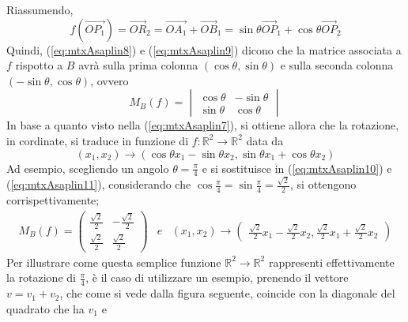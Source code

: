 \begin{es}
\begin{enumerate}
    Riassumendo,
    \begin{equation}
      \label{eq:mtxAsaplin9}
      f(\vec{OP_1})=\vec{OR}_2=\vec{OA_1}+\vec{OB}_1=\sin\theta
      \vec{OP}_1+\cos\theta\vec{OP}_2
    \end{equation}
    Quindi, (\ref{eq:mtxAsaplin8}) e (\ref{eq:mtxAsaplin9}) dicono
    che la matrice associata a $f$ rispotto a $B$ avrà sulla prima
    colonna $(\cos\theta, \sin\theta)$ e sulla seconda colonna
    $(-\sin \theta, \cos\theta)$, ovvero
    \begin{equation}
      \label{eq:mtxAsaplin10}
      M_B(f)=
      \begin{vmatrix}
        \cos\theta & -\sin\theta\\
        \sin\theta & \cos \theta
      \end{vmatrix}
    \end{equation}
    In base a quanto visto nella (\ref{eq:mtxAsaplin7}), si ottiene
    allora che la rotazione, in cordinate, si traduce in funzione di
    $f:\mathds{R}^2\to\mathds{R}^2$ data da
    \begin{equation}
      \label{eq:mtxAsaplin11}
      (x_1,x_2)\to (\cos\theta{}x_1-\sin\theta{}x_2,\sin\theta{}x_1
      +\cos\theta{}x_2)
    \end{equation}
    Ad esempio, scegliendo un angolo $\theta=\frac{\pi}{4}$ e si
    sostituisce in (\ref{eq:mtxAsaplin10}) e (\ref{eq:mtxAsaplin11}),
    considerando che $\cos\frac{\pi}{4}=\sin\frac{\pi}{4}=\frac{\sqrt{2}}{2}$,
    si ottengono corrispettivamente;
    \begin{eqnarray}
      \label{eq:mtxAsaplin12}
      M_B(f)=
      \begin{pmatrix}
        \frac{\sqrt{2}}{2} & -\frac{\sqrt{2}}{2}\\
        \frac{\sqrt{2}}{2} & \frac{\sqrt{2}}{2}
      \end{pmatrix} & e & (x_1,x_2)\to
                          \begin{pmatrix}
                            \frac{\sqrt{2}}{2}x_1-\frac{\sqrt{2}}{2}x_2,
                            \frac{\sqrt{2}}{2}x_1+\frac{\sqrt{2}}{2}x_2
                          \end{pmatrix}
    \end{eqnarray}
    Per illustrare come questa semplice funzione $\mathds{R}^2\to \mathds{R}^2$
    rappresenti effettivamente la rotazione di $\frac{\pi}{4}$, è il caso di
    utilizzare un esempio, prenendo il vettore $v=v_1+v_2$, che come si vede
    dalla figura seguente, coincide con la diagonale del quadrato che ha $v_1$ e

\end{enumerate}
\end{es}
